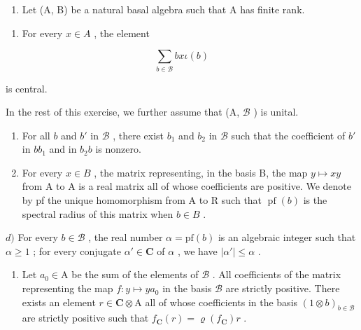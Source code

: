 \begin{enumerate}
\def\labelenumi{\arabic{enumi})}
\setcounter{enumi}{7}
\tightlist
\item
  Let (A, B) be a natural basal algebra such that A has finite rank.
\end{enumerate}

\begin{enumerate}
\def\labelenumi{\alph{enumi})}
\tightlist
\item
  For every \(x \in A\) , the element
\end{enumerate}

\[
\sum_ {b \in \mathcal {B}} b x \iota (b)
\]

is central.

In the rest of this exercise, we further assume that (A, \(\mathcal{B}\) ) is unital.

\begin{enumerate}
\def\labelenumi{\alph{enumi})}
\setcounter{enumi}{1}
\item
  For all \(b\) and \(b'\) in \(\mathcal{B}\) , there exist \(b_1\) and \(b_2\) in \(\mathcal{B}\) such that the coefficient of \(b'\) in \(bb_1\) and in \(b_2b\) is nonzero.
\item
  For every \(x \in B\) , the matrix representing, in the basis B, the map \(y \mapsto xy\) from A to A is a real matrix all of whose coefficients are positive. We denote by pf the unique homomorphism from A to R such that \(\operatorname{pf}(b)\) is the spectral radius of this matrix when \(b \in B\) .
\end{enumerate}

\(d)\) For every \(b \in \mathcal{B}\) , the real number \(\alpha = \mathrm{pf}(b)\) is an algebraic integer such that \(\alpha \geqslant 1\) ; for every conjugate \(\alpha' \in \mathbf{C}\) of \(\alpha\) , we have \(|\alpha'| \leqslant \alpha\) .

\begin{enumerate}
\def\labelenumi{\alph{enumi})}
\setcounter{enumi}{4}
\tightlist
\item
  Let \(a_0 \in \mathrm{A}\) be the sum of the elements of \(\mathcal{B}\) . All coefficients of the matrix representing the map \(f: y \mapsto ya_0\) in the basis \(\mathcal{B}\) are strictly positive. There exists an element \(r \in \mathbf{C} \otimes \mathrm{A}\) all of whose coefficients in the basis \((1 \otimes b)_{b \in \mathcal{B}}\) are strictly positive such that \(f_{\mathbf{C}}(r) = \varrho(f_{\mathbf{C}})r\) .
\end{enumerate}

